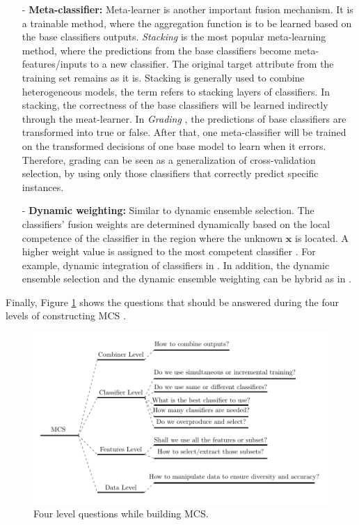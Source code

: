 \begin{itemize}
\item[-]\textbf{Meta-classifier:}   
Meta-learner is another important fusion mechanism. It is a trainable method, where the aggregation function is to be learned based on the base classifiers outputs. \textit{Stacking} \cite{Wolpert1992} is the most popular meta-learning method, where the predictions from the base classifiers become meta-features/inputs to a new classifier. The original target attribute from the training set remains as it is. Stacking
is generally used to combine heterogeneous models, the term refers to stacking layers of classifiers. In stacking, the correctness of the base classifiers will be learned indirectly through the meat-learner. In \textit{Grading} \cite{seewald2001}, the predictions of base classifiers are transformed into true or false. After that, one meta-classifier will be trained on the transformed decisions of one base model to learn when it errors. Therefore, grading can be seen as a generalization of cross-validation selection, by using only those classifiers that correctly predict specific instances. 



\item[-]\textbf{Dynamic weighting:} Similar to dynamic ensemble selection. The classifiers' fusion weights are determined dynamically based on the local competence of the classifier in the region where the unknown $\textbf{x}$ is located. A higher weight value is assigned to the most competent classifier  \cite{cruz2018}. For example, dynamic integration of classifiers in \cite{Tsymbal2008}. In addition, the dynamic ensemble selection and the dynamic ensemble weighting can be hybrid as in \cite{KO2008}.       
\end{itemize}


Finally, Figure \ref{ch2:four-levels} shows the questions that should be answered during the four levels of constructing MCS \cite{kuncheva2014}.     

\begin{figure}[!ht]
    \centering
    \includegraphics[width=\textwidth]{2_Background/figures/fig-four-levels.pdf}
    \caption{ Four level questions while building MCS.}
    \label{ch2:four-levels}
\end{figure}


